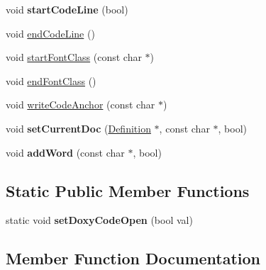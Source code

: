 \begin{DoxyCompactItemize}
\item 
\mbox{\label{class_latex_code_generator_abad76eebb986e192639b09878d46ce49}} 
void {\bfseries start\+Code\+Line} (bool)
\item 
void \mbox{\hyperlink{class_latex_code_generator_a8e32150386fe38561a0b2c82611fee9d}{end\+Code\+Line}} ()
\item 
void \mbox{\hyperlink{class_latex_code_generator_a46db28807c10d4fe78941dd0d907b73a}{start\+Font\+Class}} (const char $\ast$)
\item 
void \mbox{\hyperlink{class_latex_code_generator_a2b3c977134c51f9775042a0c7f469077}{end\+Font\+Class}} ()
\item 
void \mbox{\hyperlink{class_latex_code_generator_a272d84903dad24a0f8bae1c8d4c8e239}{write\+Code\+Anchor}} (const char $\ast$)
\item 
\mbox{\label{class_latex_code_generator_a0c48d389fe5c774f6b597a502294c1bd}} 
void {\bfseries set\+Current\+Doc} (\mbox{\hyperlink{class_definition}{Definition}} $\ast$, const char $\ast$, bool)
\item 
\mbox{\label{class_latex_code_generator_a724f226f6618daa64e37aae29cadeec0}} 
void {\bfseries add\+Word} (const char $\ast$, bool)
\end{DoxyCompactItemize}
\subsection*{Static Public Member Functions}
\begin{DoxyCompactItemize}
\item 
\mbox{\label{class_latex_code_generator_a0b4dc5faed81ce331153017ea55da09a}} 
static void {\bfseries set\+Doxy\+Code\+Open} (bool val)
\end{DoxyCompactItemize}


\subsection{Member Function Documentation}
\mbox{\label{class_latex_code_generator_a1df8a10f2ab2ef1387d5030e4abd97bb}} 
